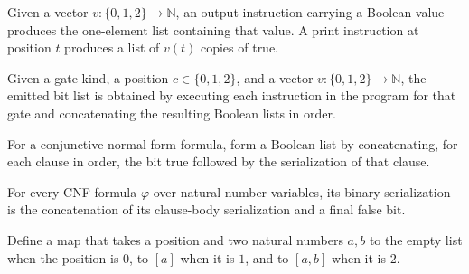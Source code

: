 \begin{definition}
\label{BoolCircuit.CktSatReduction.Emitter.exec}
\leanok
{}
Given a vector $v:\{0,1,2\}\to\mathbb N$, an output instruction carrying a Boolean value
produces the one-element list containing that value. A print instruction at position $t$
produces a list of $v(t)$ copies of true.
\end{definition}

\begin{definition}
\label{BoolCircuit.CktSatReduction.Emitter.emitBits}
\leanok
{}
Given a gate kind, a position $c\in\{0,1,2\}$, and a vector $v:\{0,1,2\}\to\mathbb N$,
the emitted bit list is obtained by executing each instruction in the program for that
gate and concatenating the resulting Boolean lists in order.
\end{definition}

\begin{definition}
\label{BoolCircuit.CktSatReduction.Emitter.serBody}
\leanok
{}
For a conjunctive normal form formula, form a Boolean list by concatenating, for each
clause in order, the bit true followed by the serialization of that clause.
\end{definition}

\begin{theorem}
\label{BoolCircuit.CktSatReduction.Emitter.serialize_eq_serBody}
\leanok
{}
For every CNF formula $\varphi$ over natural-number variables, its binary serialization
is the concatenation of its clause-body serialization and a final false bit.
\end{theorem}

\begin{definition}
\label{BoolCircuit.CktSatReduction.Emitter.argsOf}
\leanok
Define a map that takes a position and two natural numbers $a,b$ to the empty list when
the position is $0$, to $[a]$ when it is $1$, and to $[a,b]$ when it is $2$.
\end{definition}

